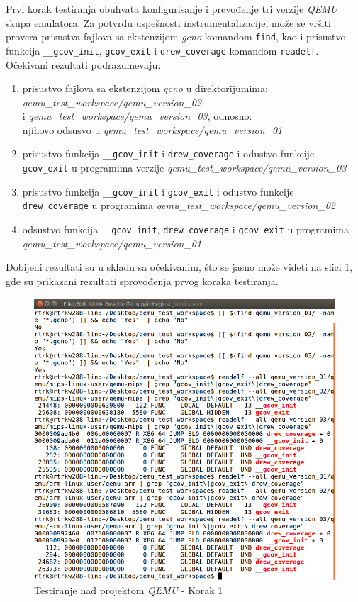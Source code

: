 \documentclass[12pt,oneside]{memoir}
\newcommand{\kod}[1]{\texttt{#1}}
\newcommand{\strano}[1]{\textit{#1}}
\begin{document}
Prvi korak testiranja obuhvata konfigurisanje i prevođenje tri verzije \strano{QEMU} skupa emulatora. Za  potvrdu uspešnosti instrumentalizacije, može se vršiti provera prisustva fajlova sa ekstenzijom \strano{gcno} komandom \kod{find}, kao i prisustvo funkcija  \kod{\_\_gcov\_init}, \kod{gcov\_exit} i \kod{drew\_coverage} komandom \kod{readelf}. Očekivani rezultati podrazumevaju:
\begin{enumerate}
\item prisustvo fajlova sa ekstenzijom \strano{gcno} u direktorijumima: \\ \strano{qemu\_test\_workspace/qemu\_version\_02} \\ i \strano{qemu\_test\_workspace/qemu\_version\_03}, odnosno: \\ njihovo odsusvo u \strano{qemu\_test\_workspace/qemu\_version\_01}
\item prisustvo funkcija \kod{\_\_gcov\_init} i \kod{drew\_coverage} i odustvo funkcije \kod{gcov\_exit} u programima verzije \strano{qemu\_test\_workspace/qemu\_version\_03}
\item prisustvo funkcija \kod{\_\_gcov\_init} i \kod{gcov\_exit} i odustvo funkcije \kod{drew\_coverage} u programima  \strano{qemu\_test\_workspace/qemu\_version\_02}
\item odsustvo funkcija \kod{\_\_gcov\_init}, \kod{drew\_coverage} i \kod{gcov\_exit} u programima \strano{qemu\_test\_workspace/qemu\_version\_01}
\end{enumerate}
Dobijeni rezultati su u skladu sa očekivanim, što se jasno može videti na slici \ref{fig:qemu-test-1}, gde su prikazani rezultati sprovođenja prvog koraka testiranja.  

\begin{figure}[!ht]
  \centering
  \includegraphics[width=\textwidth]{img/qemu-test-1-ng.png}
  \caption{Testiranje nad projektom \strano{QEMU} - Korak 1}
  \label{fig:qemu-test-1}
\end{figure} 
\end{document}
